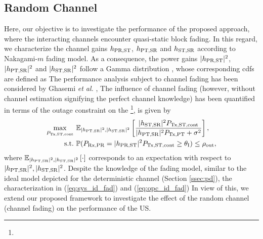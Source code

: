 \subsection{Random Channel}\label{ssec:ltpa}
Here, our objective is to investigate the performance of the proposed approach, where the interacting channels encounter quasi-static block fading.  In this regard, we characterize the channel gains $h_{\text{PR,ST}}$, $h_{\text{PT,SR}}$ and $h_{\text{ST,SR}}$ according to Nakagami-$m$ fading model. As a consequence, the power gains $|h_{\text{PR,ST}}|^2$, $|h_{\text{PT,SR}}|^2$ and $|h_{\text{ST,SR}}|^2$ follow a Gamma distribution \cite{Goldsmith05}, whose corresponding cdfs are defined as  The performance analysis subject to channel fading has been considered by Ghasemi \textit{et al.} \cite{Ghasemi06, Ghasemi07},  The influence of channel fading (however, without channel estimation signifying the perfect channel knowledge) has been quantified in terms of the outage constraint on the \footnote{}, is given by %
\begin{align}
	\tc{\maxi_{\preg}} & \text{ } \e{\pgpt, \pgs }{ \frac{\pgs \preg}{\pgpt \ptranpt + \nps}} \label{eq:sys_id_fad}, \\
	\text{s.t.} & \text{ } \tc{\p(\pp = \pgpo \preg \ge \ite)} \le \opc, \label{eq:opc_id_fad} 
\end{align}
where ${\mathbb E}_{|h_{\text{PT,SR}}|^2, |h_{\text{ST,SR}}|^2}\left[ \cdot \right]$ corresponds to an expectation with respect to $|h_{\text{PT,SR}}|^2, |h_{\text{ST,SR}}|^2$.
Despite the knowledge of the fading model, similar to the ideal model depicted for the deterministic channel (Section \ref{ssec:pd}), the characterization in (\ref{eq:sys_id_fad}) and (\ref{eq:opc_id_fad})  In view of this, we extend our proposed framework to investigate the effect of the random channel (channel fading) on the performance of the US.

